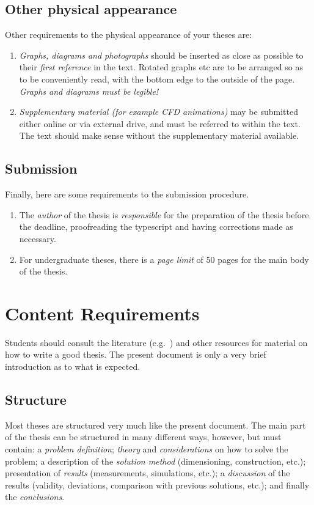 \section{Other physical appearance}
Other requirements to the physical appearance of your theses are:
\begin{enumerate}
\item \emph{Graphs, diagrams and photographs} should be inserted as close as
possible to their \emph{first reference} in the text. Rotated
graphs etc are to be arranged so as to be conveniently read, with the
bottom edge to the outside of the page.
\emph{Graphs and diagrams must be legible!}
\item \emph{Supplementary material (for example CFD animations)} may be submitted either online or via external drive, and must be referred to within the text. The text should make sense without the supplementary material available. 
\end{enumerate}

\section{Submission}

Finally, here are some requirements to the submission procedure. 

\begin{enumerate}
\item The \emph{author} of the thesis is \emph{responsible} for the preparation of the
thesis before the deadline, proofreading the
typescript and having corrections made as necessary.
\item For undergraduate theses, there is a \emph{page limit} of 50 pages for the main body of the thesis.
\end{enumerate}



\chapter{Content Requirements}\label{ch:content}

Students should consult the literature (e.g.~\cite{Sid99,StrWhi79,Coo64,GRS14})
and other resources for material on how to write a good
thesis.  The present document is only a very brief introduction as to what
is expected.

\nocite{NieLeh03,HasLehKwo05}

\section{Structure}
Most theses are structured very much like the present document.
The main part of the thesis can be structured in many different ways,
however, but must contain: a \emph{problem definition};
\emph{theory} and \emph{considerations} on how to solve the problem;
a description of the \emph{solution method} (dimensioning, construction,
etc.);
presentation of \emph{results} (measurements, simulations, etc.);
a \emph{discussion} of the results (validity, deviations, comparison
with previous solutions, etc.); and finally the \emph{conclusions}.

